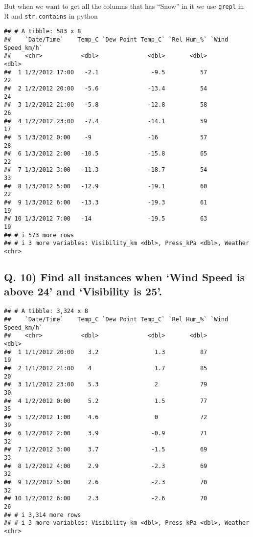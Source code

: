 \documentclass[
]{article}
\begin{document}
But when we want to get all the columns that has ``Snow'' in it we use
\texttt{grepl} in R and \texttt{str.contains} in python

\begin{verbatim}
## # A tibble: 583 x 8
##    `Date/Time`    Temp_C `Dew Point Temp_C` `Rel Hum_%` `Wind Speed_km/h`
##    <chr>           <dbl>              <dbl>       <dbl>             <dbl>
##  1 1/2/2012 17:00   -2.1               -9.5          57                22
##  2 1/2/2012 20:00   -5.6              -13.4          54                24
##  3 1/2/2012 21:00   -5.8              -12.8          58                26
##  4 1/2/2012 23:00   -7.4              -14.1          59                17
##  5 1/3/2012 0:00    -9                -16            57                28
##  6 1/3/2012 2:00   -10.5              -15.8          65                22
##  7 1/3/2012 3:00   -11.3              -18.7          54                33
##  8 1/3/2012 5:00   -12.9              -19.1          60                22
##  9 1/3/2012 6:00   -13.3              -19.3          61                19
## 10 1/3/2012 7:00   -14                -19.5          63                19
## # i 573 more rows
## # i 3 more variables: Visibility_km <dbl>, Press_kPa <dbl>, Weather <chr>
\end{verbatim}

\hypertarget{q.-10-find-all-instances-when-wind-speed-is-above-24-and-visibility-is-25.}{%
\subsection{Q. 10) Find all instances when `Wind Speed is above 24' and
`Visibility is
25'.}\label{q.-10-find-all-instances-when-wind-speed-is-above-24-and-visibility-is-25.}}

\begin{verbatim}
## # A tibble: 3,324 x 8
##    `Date/Time`    Temp_C `Dew Point Temp_C` `Rel Hum_%` `Wind Speed_km/h`
##    <chr>           <dbl>              <dbl>       <dbl>             <dbl>
##  1 1/1/2012 20:00    3.2                1.3          87                19
##  2 1/1/2012 21:00    4                  1.7          85                20
##  3 1/1/2012 23:00    5.3                2            79                30
##  4 1/2/2012 0:00     5.2                1.5          77                35
##  5 1/2/2012 1:00     4.6                0            72                39
##  6 1/2/2012 2:00     3.9               -0.9          71                32
##  7 1/2/2012 3:00     3.7               -1.5          69                33
##  8 1/2/2012 4:00     2.9               -2.3          69                32
##  9 1/2/2012 5:00     2.6               -2.3          70                32
## 10 1/2/2012 6:00     2.3               -2.6          70                26
## # i 3,314 more rows
## # i 3 more variables: Visibility_km <dbl>, Press_kPa <dbl>, Weather <chr>
\end{verbatim}
\end{document}
